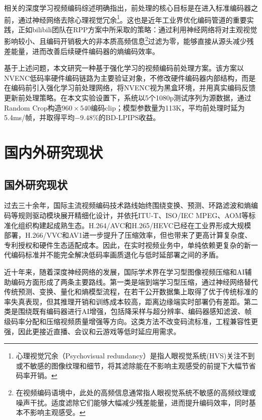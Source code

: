 相关的深度学习视频编码综述\cite{ref16-ding2021advances}明确指出，前处理的核心目标是在进入标准编码器之前，通过神经网络去除心理视觉冗余\footnote{心理视觉冗余（Psychovisual redundancy）是指人眼视觉系统(HVS)关注不到或不敏感的图像纹理和细节，将其滤除能在不影响主观感受的前提下大幅节省码率开销。}。这也是近年工业界优化编码管道的重要实践，正如bilibili团队\cite{ref17-ma2023rateperception}在RPP方案中所采取的策略：通过利用神经网络将对主观视觉影响较小、且编码开销极大的非本质高频信息\footnote{在视频编码语境中，此处的高频信息通常指人眼视觉系统不敏感的高频纹理或噪声干扰。适度滤除它们能够大幅减少残差能量，进而提升编码效率，同时基本不影响主观感受。}过滤为零，能够直接从源头减少残差能量，进而改善后续硬件编码器的熵编码效率。
    
基于上述问题，本文研究一种基于强化学习的视频编码前处理方案。该方案以NVENC低码率硬件编码链路为主要验证对象，不修改硬件编码器内部结构，而是在编码前引入强化学习前处理网络，将NVENC视为黑盒环境，并用真实编码反馈更新前处理策略。在本文实验设置下，系统以5个1080p测试序列为源数据，通过Random Crop构造$960\times540$编码clip；模型参数量为113K，平均前处理时延为5.4ms/帧，并取得平均$-9.48\%$的BD-LPIPS收益。

\section{国内外研究现状}

\subsection{国外研究现状}

过去三十余年，国际主流视频编码技术路线始终围绕变换、预测、环路滤波和熵编码等规则驱动模块展开精细化设计，并依托ITU-T、ISO/IEC MPEG、AOM等标准化组织构建起成熟生态\cite{ref1-bross2021vvc}。H.264/AVC和H.265/HEVC已经在工业界形成大规模部署，H.266/VVC和AV1进一步提升了压缩效率，但也带来了更高计算复杂度、专利授权和硬件生态适配成本。因此，在实时视频业务中，单纯依赖更复杂的新一代编码标准并不能完全解决低码率画质退化与低时延部署之间的矛盾。

近十年来，随着深度神经网络的发展，国际学术界在学习型图像视频压缩和AI辅助编码方面形成了两条主要路线\cite{ref16-ding2021advances}。第一类是端到端学习型压缩，通过神经网络替代传统预测、变换、量化和熵模型流程\cite{ref8-lu2019dvc,ref6-li2021deep,ref4-cong2025adaptive}，在若干公开数据集上取得了优于传统标准的率失真表现，但其推理开销和训练成本较高，距离边缘端实时部署仍有差距。第二类是围绕既有编码器进行AI增强，包括降采样与超分辨率\cite{ref9-shen2011downsampling}、编码器感知滤波\cite{ref11-vanam2023spie,ref12-vanam2023dcc}、帧级码率分配\cite{ref3-chen2018rl}和压缩视频质量增强\cite{ref20-chen2023fastmfqe}等方向。这类方法不改变码流标准，工程兼容性更强，因此更接近直播、会议和云游戏等低时延应用需求。

